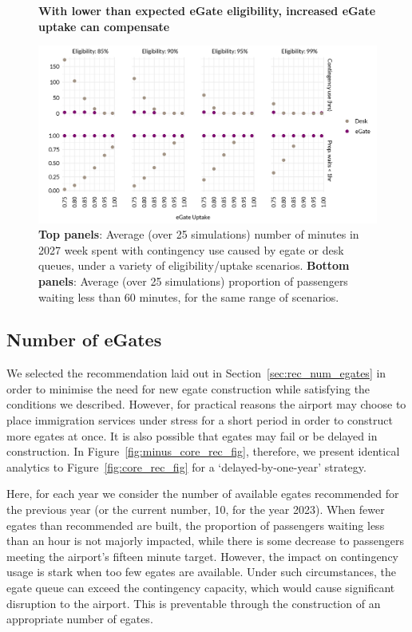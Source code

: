 \documentclass[10pt]{article}
\newcommand*{\figuretitle}[1]{%
    {\centering%
    \textbf{#1}%
    \par\medskip}%
}
\begin{document}
\begin{figure}[!ht]
    \centering
    \figuretitle{With lower than expected eGate eligibility, increased eGate uptake can compensate}
    \includegraphics[width=\textwidth]{figures/robustness_fig.png}
     \caption{\textbf{Top panels}: Average (over 25 simulations) number of minutes in 2027 week spent with contingency use caused by \gls{egate} or desk queues, under a variety of eligibility/uptake scenarios. \textbf{Bottom panels}: Average (over 25 simulations) proportion of passengers waiting less than 60 minutes, for the same range of scenarios.} \label{fig:robustness_fig}
\end{figure}

\subsection{Number of eGates}
We selected the recommendation laid out in Section~\ref{sec:rec_num_egates} in order to minimise the need for new \gls{egate} construction while satisfying the conditions we described. However, for practical reasons the airport may choose to place immigration services under stress for a short period in order to construct more \glspl{egate} at once. It is also possible that \glspl{egate} may fail or be delayed in construction. In Figure~\ref{fig:minus_core_rec_fig}, therefore, we present identical analytics to Figure~\ref{fig:core_rec_fig} for a `delayed-by-one-year' strategy.

 Here, for each year we consider the number of available \glspl{egate} recommended for the previous year (or the current number, 10, for the year 2023). When fewer \glspl{egate} than recommended are built, the proportion of passengers waiting less than an hour is not majorly impacted, while there is some decrease to passengers meeting the airport's fifteen minute target.  However, the impact on contingency usage is stark when too few \glspl{egate} are available. Under such circumstances, the \gls{egate} queue can exceed the contingency capacity, which would cause significant disruption to the airport. This is preventable through the construction of an appropriate number of \glspl{egate}.
\end{document}
